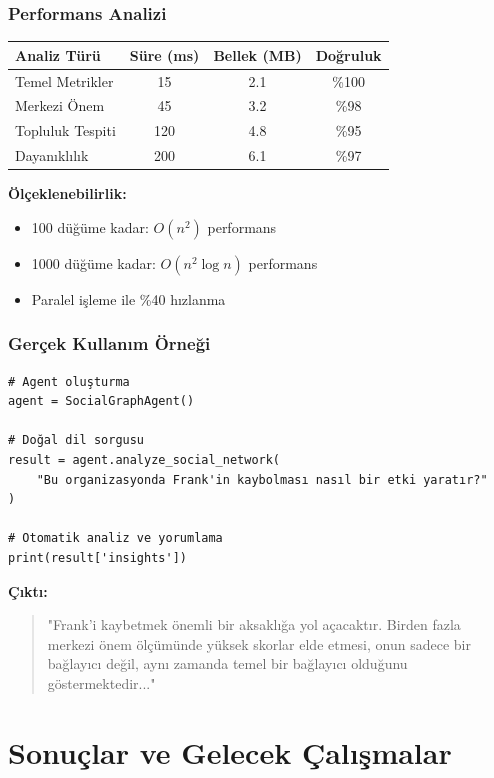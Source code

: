 \documentclass[aspectratio=169]{beamer}
\begin{document}
\begin{frame}
\frametitle{Performans Analizi}
\begin{table}
\centering
\begin{tabular}{|l|c|c|c|}
\hline
\textbf{Analiz Türü} & \textbf{Süre (ms)} & \textbf{Bellek (MB)} & \textbf{Doğruluk} \\
\hline
Temel Metrikler & 15 & 2.1 & \%100 \\
Merkezi Önem & 45 & 3.2 & \%98 \\
Topluluk Tespiti & 120 & 4.8 & \%95 \\
Dayanıklılık & 200 & 6.1 & \%97 \\
\hline
\end{tabular}
\end{table}

\vspace{0.3cm}
\textbf{Ölçeklenebilirlik:}
\begin{itemize}
    \item 100 düğüme kadar: $O(n^2)$ performans
    \item 1000 düğüme kadar: $O(n^2 \log n)$ performans
    \item Paralel işleme ile \%40 hızlanma
\end{itemize}
\end{frame}

\begin{frame}[fragile]
\frametitle{Gerçek Kullanım Örneği}
\begin{lstlisting}[caption=Sistem Kullanımı]
# Agent oluşturma
agent = SocialGraphAgent()

# Doğal dil sorgusu
result = agent.analyze_social_network(
    "Bu organizasyonda Frank'in kaybolması nasıl bir etki yaratır?"
)

# Otomatik analiz ve yorumlama
print(result['insights'])
\end{lstlisting}

\textbf{Çıktı:}
\begin{quote}
"Frank'i kaybetmek önemli bir aksaklığa yol açacaktır. Birden fazla merkezi önem ölçümünde yüksek skorlar elde etmesi, onun sadece bir bağlayıcı değil, aynı zamanda temel bir bağlayıcı olduğunu göstermektedir..."
\end{quote}
\end{frame}

\section{Sonuçlar ve Gelecek Çalışmalar}
\end{document}
